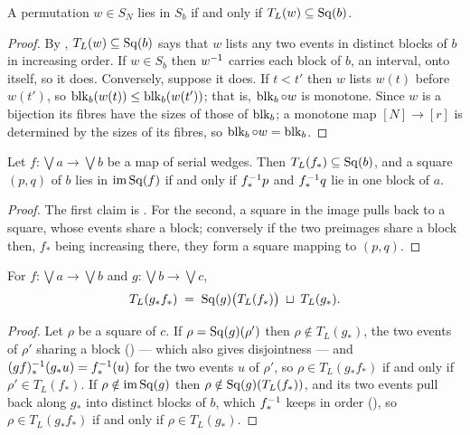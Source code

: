 \documentclass[11pt]{article}
\begin{document}
\begin{lemma}\label{lem:young-sq}
  A permutation $w \in S_N$ lies in $S_b$ if and only if $T_L(w) \subseteq \operatorname{Sq}(b)$.
\end{lemma}
\begin{proof}
  By , $T_L(w) \subseteq \operatorname{Sq}(b)$ says that $w$ lists any two events in
  distinct blocks of $b$ in increasing order. If $w \in S_b$ then $w^{-1}$ carries each block of
  $b$, an interval, onto itself, so it does. Conversely, suppose it does. If $t < t'$ then $w$
  lists $w(t)$ before $w(t')$, so $\operatorname{blk}_b(w(t)) \le \operatorname{blk}_b(w(t'))$; that is, $\operatorname{blk}_b \circ w$ is
  monotone. Since $w$ is a bijection its fibres have the sizes of those of $\operatorname{blk}_b$; a monotone
  map $[N] \to [r]$ is determined by the sizes of its fibres, so $\operatorname{blk}_b \circ w = \operatorname{blk}_b$.
\end{proof}

\begin{lemma}\label{lem:sq-range}
  Let $f : \bigvee a \to \bigvee b$ be a map of serial wedges. Then $T_L(f_*) \subseteq \operatorname{Sq}(b)$,
  and a square $(p,q)$ of $b$ lies in $\operatorname{im}\operatorname{Sq}(f)$ if and only if $f_*^{-1} p$ and $f_*^{-1} q$ lie in
  one block of $a$.
\end{lemma}
\begin{proof}
  The first claim is . For the second, a square in the image pulls
  back to a square, whose events share a block; conversely if the two preimages share a block
  then, $f_*$ being increasing there, they form a square mapping to $(p,q)$.
\end{proof}

\begin{lemma}\label{lem:cocycle}
  For $f : \bigvee a \to \bigvee b$ and $g : \bigvee b \to \bigvee c$,
  \[
    T_L(g_*f_*) \;=\; \operatorname{Sq}(g)\bigl(T_L(f_*)\bigr) \;\sqcup\; T_L(g_*) .
  \]
\end{lemma}
\begin{proof}
  Let $\rho$ be a square of $c$. If $\rho = \operatorname{Sq}(g)(\rho')$ then $\rho \notin T_L(g_*)$, the two
  events of $\rho'$ sharing a block () --- which also gives disjointness --- and
  $(gf)_*^{-1}(g_*u) = f_*^{-1}(u)$ for the two events $u$ of $\rho'$, so $\rho \in T_L(g_*f_*)$ if
  and only if $\rho' \in T_L(f_*)$. If $\rho \notin \operatorname{im}\operatorname{Sq}(g)$ then
  $\rho \notin \operatorname{Sq}(g)(T_L(f_*))$, and its two events pull back along $g_*$ into distinct blocks of
  $b$, which $f_*^{-1}$ keeps in order (), so $\rho \in T_L(g_*f_*)$ if and
  only if $\rho \in T_L(g_*)$.
\end{proof}
\end{document}
